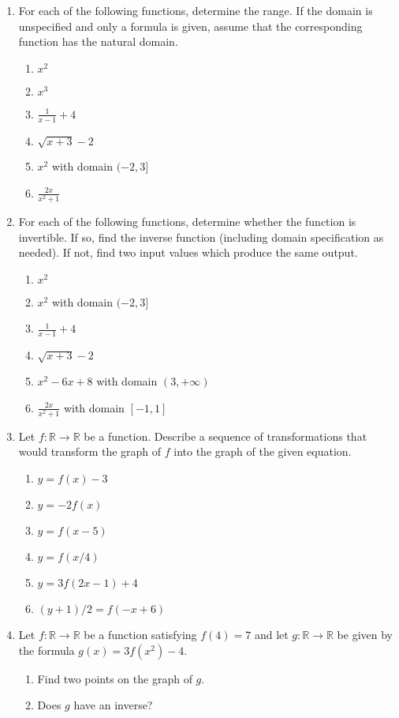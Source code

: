 \begin{enumerate}
\begin{enumerate}
\end{enumerate}
\item For each of the following functions, determine the range. If the domain is unspecified and only a formula is given, assume that the corresponding function has the natural domain.
\begin{enumerate}
\item $x^2$
\item $x^3$
\item $\frac{1}{x - 1} + 4$
\item $\sqrt{x + 3} - 2$
\item $x^2$ with domain $(-2,3]$
\item $\frac{2x}{x^2 + 1}$
\end{enumerate}
\item For each of the following functions, determine whether the function is invertible. If so, find the inverse function (including domain specification as needed). If not, find two input values which produce the same output.
\begin{enumerate}
\item $x^2$
\item $x^2$ with domain $(-2,3]$
\item $\frac{1}{x - 1} + 4$
\item $\sqrt{x + 3} - 2$
\item $x^2 - 6x + 8$ with domain $(3, +\infty)$
\item $\frac{2x}{x^2 + 1}$ with domain $[-1,1]$
\end{enumerate}
\item Let $f:\mathbb{R}\to\mathbb{R}$ be a function. Describe a sequence of transformations that would transform the graph of $f$ into the graph of the given equation.
\begin{enumerate}
\item $y = f(x) - 3$
\item $y = -2f(x)$
\item $y = f(x - 5)$
\item $y = f(x/4)$
\item $y = 3f(2x - 1) + 4$
\item $(y + 1)/2 = f(-x + 6)$
\end{enumerate}
\item Let $f:\mathbb{R}\to\mathbb{R}$ be a function satisfying $f(4) = 7$ and let $g:\mathbb{R}\to\mathbb{R}$ be given by the formula $g(x) = 3f(x^2) - 4$.
\begin{enumerate}
\item Find two points on the graph of $g$.
\item Does $g$ have an inverse?
\end{enumerate}
\end{enumerate}


